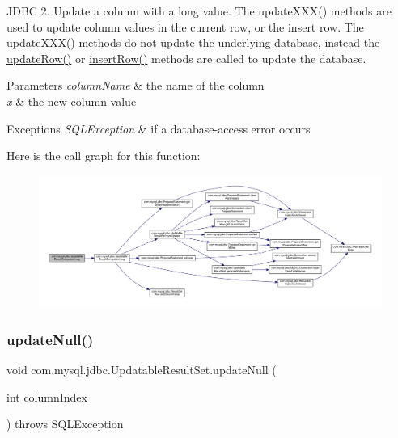 J\+D\+BC 2. Update a column with a long value. The update\+X\+X\+X() methods are used to update column values in the current row, or the insert row. The update\+X\+X\+X() methods do not update the underlying database, instead the \mbox{\hyperlink{classcom_1_1mysql_1_1jdbc_1_1_updatable_result_set_a919969ba4b3c7cbc7b18605e9f31a746}{update\+Row()}} or \mbox{\hyperlink{classcom_1_1mysql_1_1jdbc_1_1_updatable_result_set_aef041f8d9d0778083716fc26652648fa}{insert\+Row()}} methods are called to update the database.


\begin{DoxyParams}{Parameters}
{\em column\+Name} & the name of the column \\
\hline
{\em x} & the new column value\\
\hline
\end{DoxyParams}

\begin{DoxyExceptions}{Exceptions}
{\em S\+Q\+L\+Exception} & if a database-\/access error occurs \\
\hline
\end{DoxyExceptions}
Here is the call graph for this function\+:
\nopagebreak
\begin{figure}[H]
\begin{center}
\leavevmode
\includegraphics[width=350pt]{classcom_1_1mysql_1_1jdbc_1_1_updatable_result_set_a35881cdc339f9cc77868b0b89955a36a_cgraph}
\end{center}
\end{figure}
\mbox{\label{classcom_1_1mysql_1_1jdbc_1_1_updatable_result_set_a37fe836a746ef0fbbf56ca12092abedf}} 
\subsubsection{\texorpdfstring{update\+Null()}{updateNull()}\hspace{0.1cm}{\footnotesize\ttfamily [1/2]}}
{\footnotesize\ttfamily void com.\+mysql.\+jdbc.\+Updatable\+Result\+Set.\+update\+Null (\begin{DoxyParamCaption}\item[{int}]{column\+Index }\end{DoxyParamCaption}) throws S\+Q\+L\+Exception}

